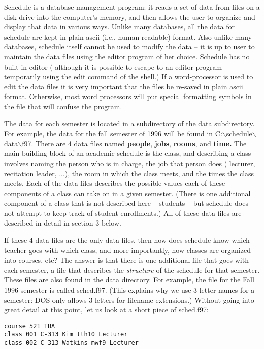 Schedule is a database management program: it reads a set of data from files
on a disk drive into the computer's memory, and then allows the user to
organize and display that data in various ways. Unlike many databases, all
the data for schedule are kept in plain ascii (i.e., human readable) format.
Also unlike many databases,  schedule  itself cannot be used to
modify the data -- it is up to user to maintain the data files using the
editor program of her choice. Schedule has no built-in editor ( although
it is possible to escape to an editor program temporarily using the edit
command of the shell.) If a word-processor is used to edit the data
files it is very important that the files be re-saved in plain ascii format.
Otherwise, most word processors will put special formatting symbols in the
file that will confuse the program. 

The data for each semester is located in a subdirectory of the data 
subdirectory. For example, the data for the fall semester of 1996 will be
found in C:$\backslash${schedule}$\backslash${data}$\backslash${f97}. There are
4 data files named {\bf people}, {\bf jobs}, {\bf rooms}, and {\bf time.}
The main building block of an academic schedule is the class, and
describing a class involves naming the person who is in charge, the job
that person does ( lecturer, recitation leader, ...), the room in which
the class meets, and the times the class meets. Each of the data files
describes the possible values each of these components of a class can take
on in a given semester. (There is one additional component of a class
that is not described here -- students -- but schedule does not attempt
to keep track of student enrollments.) All of these data files are
described in detail in section 3 below.

If these 4 data files are the only data files, then how does schedule know
which teacher goes with which class, and more importantly, how classes
are organized into courses, etc? The answer is that there is one additional
file that goes with each semester, a file  that describes the {\it structure} of
the schedule for that semester. These files are also found in the data
directory. For example, the file for the Fall 1996 semester is called
sched.f97. (This explains why we use 3 letter names for a semester: DOS only
allows 3 letters for filename extensions.) Without going into great detail
at this point, let us look at a short piece of sched.f97:
\smallskip
\begin{verbatim}
course 521 TBA
class 001 C-313 Kim tth10 Lecturer
class 002 C-313 Watkins mwf9 Lecturer
\end{verbatim}
\smallskip

